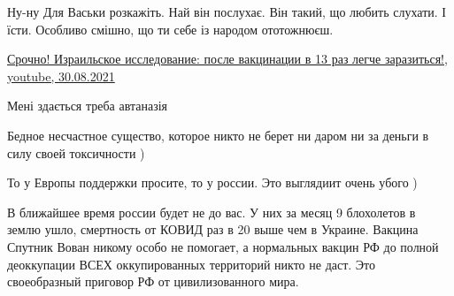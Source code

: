 \begin{itemize}
\begin{itemize}
 
Ну-ну
Для Васьки розкажіть.
Най він послухає.
Він такий, що любить слухати. І їсти.
Особливо смішно, що ти себе із народом ототожнюєш.

 
\href{https://youtu.be/Hw052FqifFw}{%
Срочно! Израильское исследование: после вакцинации в 13 раз легче заразиться!, youtube, 30.08.2021%
}

\end{itemize}

 
Мені здається треба автаназія

 

Бедное несчастное существо, которое никто не берет ни даром ни за деньги в силу
своей токсичности )

То у Европы поддержки просите, то у россии. Это выглядиит очень убого )

В ближайшее время россии будет не до вас. У них за месяц 9 блохолетов в землю
ушло, смертность от КОВИД раз в 20 выше чем в Украине. Вакцина Спутник Вован
никому особо не помогает, а нормальных вакцин РФ до полной деоккупации ВСЕХ
оккупированных территорий никто не даст. Это своеобразный приговор РФ от
цивилизованного мира.

\begin{itemize}
 

\end{itemize}
\end{itemize}
